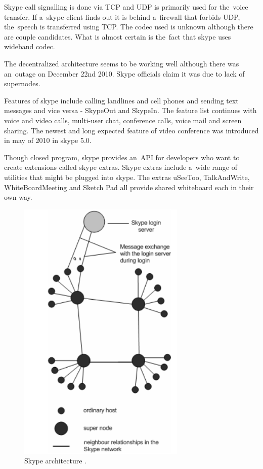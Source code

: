 Skype call signalling is done via TCP and UDP is primarily used for the~voice transfer. If a~skype client finds out it is behind a~firewall that forbids UDP, the~speech is transferred using TCP. The codec used is unknown although there are couple candidates. What is almost certain is the~fact that skype uses wideband codec. 

The decentralized architecture seems to be working well although there was an~outage on December 22nd 2010. Skype officials claim it was due to lack of supernodes\cite{skypeOutage}.  


Features of skype include calling landlines and cell phones and sending text messages and vice versa - SkypeOut and SkypeIn. The feature list continues with voice and video calls, multi-user chat, conference calls, voice mail and screen sharing. The newest and long expected feature of video conference was introduced in may of 2010 in skype 5.0. 

Though closed program, skype provides an~API for developers who want to create extensions called skype extras. Skype extras include a~wide range of utilities that might be plugged into skype. The extras uSeeToo, TalkAndWrite, WhiteBoardMeeting and Sketch Pad all provide shared whiteboard each in their own way.    

\begin{figure}[ht]
	\begin{center}
	\includegraphics[width=8cm]{fig/skype-architecture.png}
	\caption{Skype architecture \cite{skypeProtocolAnalysis}.}
	\label{fig:skypeArchitecture}
\end{center}
\end{figure}


